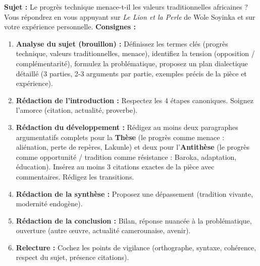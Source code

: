 \documentclass[11pt]{article}
\newcounter{popsec}
\newcounter{popsub}
\newcommand{\courssub}[1]{%
  \stepcounter{popsub}%
  \par\vspace{9pt}\noindent{\popxbold\fontsize{11.5}{13}\selectfont\color{popink}{\color{poporange}\thepopsec.\thepopsub}\hspace{6pt}#1}\par\nopagebreak\vspace{4pt}
}
\begin{document}
\courssub{Je me prépare au Bac}

\begin{exercice}
\textbf{Sujet :} \og Le progrès technique menace-t-il les valeurs traditionnelles africaines ? Vous répondrez en vous appuyant sur \emph{Le Lion et la Perle} de Wole Soyinka et sur votre expérience personnelle. \fg
\textbf{Consignes :}
\begin{enumerate}
\item \textbf{Analyse du sujet (brouillon) :} Définissez les termes clés (progrès technique, valeurs traditionnelles, menace), identifiez la tension (opposition / complémentarité), formulez la problématique, proposez un plan dialectique détaillé (3 parties, 2-3 arguments par partie, exemples précis de la pièce et expérience).
\item \textbf{Rédaction de l'introduction :} Respectez les 4 étapes canoniques. Soignez l'amorce (citation, actualité, proverbe).
\item \textbf{Rédaction du développement :} Rédigez au moins deux paragraphes argumentatifs complets pour la \textbf{Thèse} (le progrès comme menace : aliénation, perte de repères, Lakunle) et deux pour l'\textbf{Antithèse} (le progrès comme opportunité / tradition comme résistance : Baroka, adaptation, éducation). Insérez au moins 3 citations exactes de la pièce avec commentaires. Rédigez les transitions.
\item \textbf{Rédaction de la synthèse :} Proposez une dépassement (tradition vivante, modernité endogène).
\item \textbf{Rédaction de la conclusion :} Bilan, réponse nuancée à la problématique, ouverture (autre œuvre, actualité camerounaise, avenir).
\item \textbf{Relecture :} Cochez les points de vigilance (orthographe, syntaxe, cohérence, respect du sujet, présence citations).
\end{enumerate}
\end{exercice}
\end{document}
